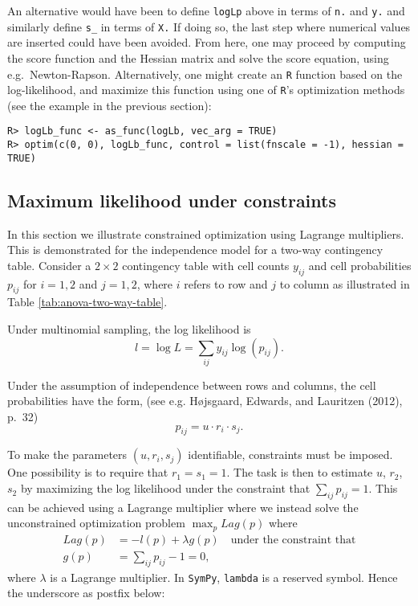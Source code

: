 An alternative would have been to define \texttt{logLp} above in terms of
\texttt{n.} and \texttt{y.} and similarly define \texttt{s\_} in terms of \texttt{X.} If doing so,
the last step where numerical values are inserted could have been
avoided. From here, one may proceed by computing the score function
and the Hessian matrix and solve the score equation, using
e.g.~Newton-Rapson. Alternatively, one might create an \texttt{R} function
based on the log-likelihood, and maximize this function using one of
\texttt{R}'s optimization methods (see the example in the previous section):

\begin{verbatim}
R> logLb_func <- as_func(logLb, vec_arg = TRUE)
R> optim(c(0, 0), logLb_func, control = list(fnscale = -1), hessian = TRUE)
\end{verbatim}

\hypertarget{maximum-likelihood-under-constraints}{%
\subsection{Maximum likelihood under constraints}\label{maximum-likelihood-under-constraints}}

In this section we illustrate constrained optimization using Lagrange multipliers.
This is demonstrated for the independence model for a two-way contingency table.
Consider a \(2 \times 2\) contingency table with cell
counts \(y_{ij}\) and cell probabilities \(p_{ij}\) for \(i=1,2\) and \(j=1,2\),
where \(i\) refers to row and \(j\) to column as
illustrated in Table \ref{tab:anova-two-way-table}.

Under multinomial sampling, the log likelihood is
\[
 l = \log L = \sum_{ij} y_{ij} \log(p_{ij}).
\]

Under the assumption of independence between rows and columns, the cell
probabilities have the form, (see e.g. Højsgaard, Edwards, and Lauritzen (2012), p.~32)
\[
p_{ij}=u \cdot r_i \cdot s_j.
\]

To make the parameters \((u, r_i, s_j)\) identifiable, constraints
must be imposed. One possibility is to require that \(r_1=s_1=1\). The
task is then to estimate \(u\), \(r_2\), \(s_2\) by maximizing the log likelihood
under the constraint that \(\sum_{ij} p_{ij} = 1\). This can be
achieved using a Lagrange multiplier where we instead solve the
unconstrained optimization problem \(\max_p Lag(p)\) where
\begin{align}
  Lag(p) &= -l(p) + \lambda g(p) \quad \text{under the constraint that} \\
  g(p) &= \sum_{ij} p_{ij} - 1 = 0 ,
\end{align}
where \(\lambda\) is a Lagrange multiplier.
In \texttt{SymPy}, \texttt{lambda} is a reserved symbol. Hence the underscore as postfix below:

